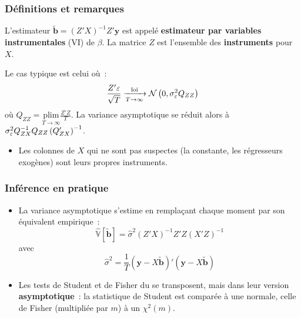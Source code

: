 \documentclass[10pt]{beamer}
\begin{document}
\begin{frame}
  \frametitle{Définitions et remarques}

  \begin{defn}{}
    L'estimateur $\tilde{\mathbf b} = (Z'X)^{-1}Z'\mathbf y$ est appelé
    \textbf{estimateur par variables instrumentales} (VI) de $\beta$. La
    matrice $Z$ est l'ensemble des \textbf{instruments} pour $X$.
  \end{defn}

  \medskip

  \begin{rem}{}
    Le cas typique est celui où~:
    \[ \frac{Z'\varepsilon}{\sqrt{T}} \xrightarrow[T\rightarrow\infty]{\text{loi}} \mathcal N\left(0,\sigma_{\varepsilon}^2 Q_{ZZ}\right) \]
    où $Q_{ZZ} = \underset{T\rightarrow\infty}{\text{plim}} \frac{Z'Z}{T}$. La
    variance asymptotique se réduit alors à
    $\sigma_{\varepsilon}^2 Q_{ZX}^{-1}Q_{ZZ}\left(Q_{ZX}'\right)^{-1}$.
  \end{rem}

  \medskip

  \begin{itemize}
  \item Les colonnes de $X$ qui ne sont pas suspectes (la constante, les
    régresseurs exogènes) sont leurs propres instruments.
  \end{itemize}

\end{frame}


\begin{frame}
  \frametitle{Inférence en pratique}

  \begin{itemize}

  \item La variance asymptotique s'estime en remplaçant chaque moment par son
    équivalent empirique~:
    \[
      \hat{\mathbb V}\left[ \tilde{\mathbf b} \right] = \hat\sigma^2 \left( Z'X \right)^{-1}Z'Z\left( X'Z \right)^{-1}
    \]
    avec
    \[
      \hat\sigma^2 = \frac{1}{T}\left( \mathbf y - X\tilde{\mathbf b} \right)'\left( \mathbf y - X\tilde{\mathbf b} \right)
    \]

  \item Les tests de Student et de Fisher du  se transposent, mais
    dans leur version \textbf{asymptotique}~: la statistique de Student est
    comparée à une normale, celle de Fisher (multipliée par $m$) à un $\chi^2(m)$.\newline

  \end{itemize}


\end{frame}
\end{document}
